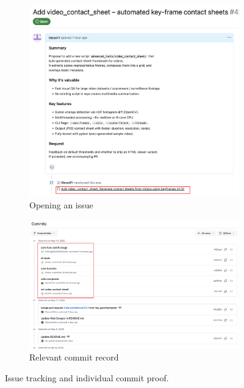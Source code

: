 \documentclass[12pt]{article}
\begin{document}
\begin{figure}[htbp]
  \centering
  \begin{subfigure}{0.48\textwidth}
    \includegraphics[width=\linewidth]{pic/issue.png}
    \caption{Opening an issue}
    \label{fig:issue}
  \end{subfigure}\hfill
  \begin{subfigure}{0.48\textwidth}
    \includegraphics[width=\linewidth]{pic/commit.png}
    \caption{Relevant commit record}
    \label{fig:commit}
  \end{subfigure}
  \caption{Issue tracking and individual commit proof.}
\end{figure}
\end{document}
